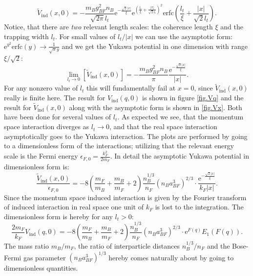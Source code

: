 \begin{equation}
\tilde{V}_{\text{ind}}(x,0) = -\frac{m_Bg_{BF}^2n_B}{\sqrt{2\pi} l_t} \text{e}^{-\frac{\sqrt{2}|x|}{\xi}}\text{e}^{\left(\frac{l_t}{\xi}+\frac{|x|}{\sqrt{2}l_t}\right)^2}\text{erfc}\left(\frac{l_t}{\xi}+\frac{|x|}{\sqrt{2}l_t}\right).
\label{eq.VFFx_exact}
\end{equation}
Notice, that there are \textit{two} relevant length scales: the coherence length $\xi$ and the trapping width $l_t$. For small values of $l_t/|x|$ we can use the asymptotic form: $\text{e}^{y^2}\text{erfc}(y) \to \frac{1}{\sqrt{\pi}y}$ and we get the Yukawa potential in one dimension with range $\xi/\sqrt{2}$: 
\begin{equation}
\lim_{l_t\to 0} \left[ \tilde{V}_{\text{ind}}(x,0) \right] = -\frac{m_Bg_{BF}^2n_B}{\pi}\frac{\text{e}^{-\frac{\sqrt{2}|x|}{\xi}}}{|x|}.
\label{eq.Vx_lt=0}
\end{equation}
For any nonzero value of $l_t$ this will fundamentally fail at $x=0$, since $\tilde{V}_{\text{ind}}(x,0)$ really is finite here. The result for $V_{\text{ind}}(q,0)$ is shown in figure \ref{fig.Vq} and the result for $\tilde{V}_{\text{ind}}(x,0)$ along with the asymptotic form is shown in \ref{fig.Vx}. Both have been done for several values of $l_t$. As expected we see, that the momentum space interaction diverges as $l_t \to 0$, and that the real space interaction asymptotically goes to the Yukawa interaction. The plots are performed by going to a dimensionless form of the interactions; utilizing that the relevant energy scale is the Fermi energy $\epsilon_{F,0} = \frac{k_F^2}{2m_F}$. In detail the asymptotic Yukawa potential in dimensionless form is:
\begin{equation}
\frac{\tilde{V}_{\text{ind}}(x,0)}{\epsilon_{F,0}} = - 8\left( \frac{m_F}{m_B} + \frac{m_B}{m_F} + 2 \right) \frac{n_B^{1/3}}{n_F}(n_Ba_{BF}^3)^{2/3} \cdot \frac{\text{e}^{ -\frac{ \sqrt{2}|x|}{\xi} } }{k_F|x|}.
\label{eq.Vxdimensionless}
\end{equation}
Since the momentum space induced interaction is given by the Fourier transform of induced interaction in real space one unit of $k_F$ is lost to the integration. The dimensionless form is hereby for any $l_t > 0$: 
\begin{equation}
\frac{2m_F}{k_F}V_{\text{ind}}(q,0) = - 8\left( \frac{m_F}{m_B} + \frac{m_B}{m_F} + 2 \right) \frac{n_B^{1/3}}{n_F}(n_Ba_{BF}^3)^{2/3} \cdot \text{e}^{F(q)} E_1(F(q)).
\label{eq.Vqdimensionless}
\end{equation}
The mass ratio $m_B/m_F$, the ratio of interparticle distances $n_B^{1/3}/n_F$ and the Bose-Fermi gas parameter $(n_Ba_{BF}^3)^{1/3}$ hereby comes naturally about by going to dimensionless quantities. 

